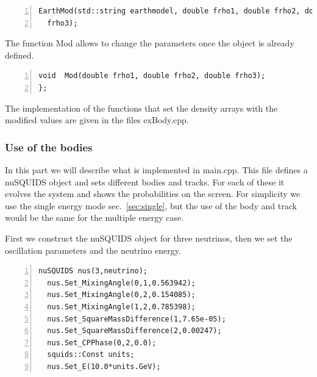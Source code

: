 \documentclass[3p,12pt]{elsarticle}
\newcommand{\ttf}{\ttfamily}
\begin{document}
\begin{lstlisting}[frame=leftline, numbers = left,breaklines=true,label = ex:sin1,firstnumber=last]
  EarthMod(std::string earthmodel, double frho1, double frho2, double
  frho3);
\end{lstlisting}
The function {\ttf Mod} allows to change the parameters once the
object is already defined.
\begin{lstlisting}[frame=leftline, numbers =
  left,breaklines=true,label = ex:sin1,firstnumber=last]
  void  Mod(double frho1, double frho2, double frho3);
};

\end{lstlisting}

The implementation of the functions that set the density arrays with
the modified values are given in the files {\ttf exBody.cpp}.

\subsubsection{Use of the bodies}

In this part we will describe what is implemented in {\ttf
  main.cpp}.
This file defines a nuSQUIDS object and sets different bodies and
tracks. For each of these it evolves the system and shows the
probabilities on the screen.
For simplicity we use the single energy mode sec.~\ref{sec:single}, but the use of the body
and track would be the same for the multiple energy case.

First we construct the nuSQUIDS object for three neutrinos, then we set the
oscillation parameters and the neutrino energy.

\begin{lstlisting}[frame=leftline, numbers =
  left,breaklines=true,label = ex:sin1]
  nuSQUIDS nus(3,neutrino);
  nus.Set_MixingAngle(0,1,0.563942);
  nus.Set_MixingAngle(0,2,0.154085);
  nus.Set_MixingAngle(1,2,0.785398);
  nus.Set_SquareMassDifference(1,7.65e-05);
  nus.Set_SquareMassDifference(2,0.00247);
  nus.Set_CPPhase(0,2,0.0);
  squids::Const units;
  nus.Set_E(10.0*units.GeV);
\end{lstlisting}
\end{document}
